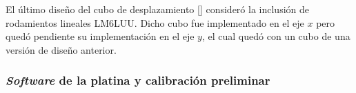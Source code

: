 \begin{figure}[H]
\begin{floatrow}
	\end{floatrow}
\end{figure}

El último diseño del cubo de desplazamiento [\href{https://github.com/jrr1984/open_frame_XYStage/blob/master/3dprintedparts/STLs/cuboconLM6UU_2demarzo.STL}{\faCubes}] consideró la inclusión de rodamientos lineales LM6LUU. Dicho cubo fue implementado en el eje $\textit{x}$ pero quedó pendiente su implementación en el eje $\textit{y}$, el cual quedó con un cubo de una versión de diseño anterior.


\singlespacing
\subsubsection{\textit{Software} de la platina \href{https://github.com/jrr1984/open\_frame\_XYStage}{\faGithub}  y calibración preliminar}
\label{sec:softcalib}

